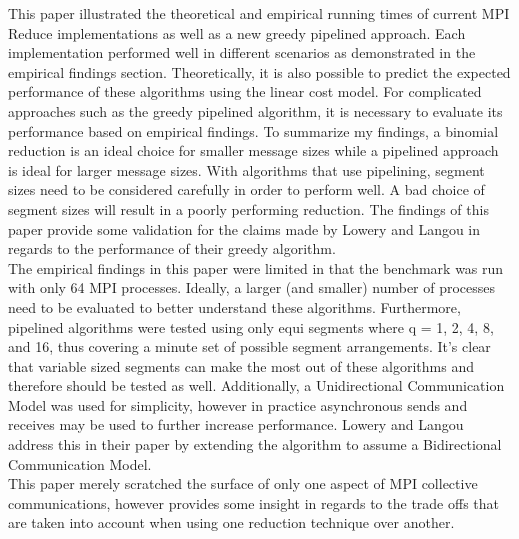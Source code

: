 \documentclass{article}
\begin{document}
This paper illustrated the theoretical and empirical running times of current MPI Reduce
implementations as well as a new greedy pipelined approach. Each implementation performed well in
different scenarios as demonstrated in the empirical findings section. Theoretically, it is also possible to
predict the expected performance of these algorithms using the linear cost model. For complicated
approaches such as the greedy pipelined algorithm, it is necessary to evaluate its performance based on
empirical findings. To summarize my findings, a binomial reduction is an ideal choice for smaller
message sizes while a pipelined approach is ideal for larger message sizes. With algorithms that use
pipelining, segment sizes need to be considered carefully in order to perform well. A bad choice of
segment sizes will result in a poorly performing reduction. The findings of this paper provide some
validation for the claims made by Lowery and Langou in regards to the performance of their greedy
algorithm. \\

The empirical findings in this paper were limited in that the benchmark was run with only 64 MPI
processes. Ideally, a larger (and smaller) number of processes need to be evaluated to better understand
these algorithms. Furthermore, pipelined algorithms were tested using only equi segments where q = 1, 2,
4, 8, and 16, thus covering a minute set of possible segment arrangements. It’s clear that variable sized
segments can make the most out of these algorithms and therefore should be tested as well. Additionally,
a Unidirectional Communication Model was used for simplicity, however in practice asynchronous sends
and receives may be used to further increase performance. Lowery and Langou \cite{Lowery-13} address this 
in their paper by extending the algorithm to assume a Bidirectional Communication Model. \\

This paper merely scratched the surface of only one aspect of MPI collective communications,
however provides some insight in regards to the trade offs that are taken into account when using
one reduction technique over another.



\end{document}
